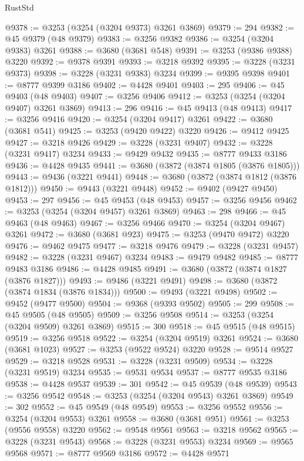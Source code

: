 \begin{lexlean}{RustStd}
\begin{coremodule}
@9378 := @3253 (@3254 (@3204 @9373) @3261 @3869)
@9379 := 294
@9382 := @45 @9379 (@48 @9379)
@9383 := @3256 @9382
@9386 := @3254 (@3204 @9383) @3261
@9388 := @3680 (@3681 @548)
@9391 := @3253 (@9386 @9388) @3220
@9392 := @9378 @9391
@9393 := @3218 @9392
@9395 := @3228 (@3231 @9373)
@9398 := @3228 (@3231 @9383) @3234
@9399 := @9395 @9398
@9401 := @8777 @9399 @3186
@9402 := @4428 @9401
@9403 := 295
@9406 := @45 @9403 (@48 @9403)
@9407 := @3256 @9406
@9412 := @3253 (@3254 (@3204 @9407) @3261 @3869)
@9413 := 296
@9416 := @45 @9413 (@48 @9413)
@9417 := @3256 @9416
@9420 := @3254 (@3204 @9417) @3261
@9422 := @3680 (@3681 @541)
@9425 := @3253 (@9420 @9422) @3220
@9426 := @9412 @9425
@9427 := @3218 @9426
@9429 := @3228 (@3231 @9407)
@9432 := @3228 (@3231 @9417) @3234
@9433 := @9429 @9432
@9435 := @8777 @9433 @3186
@9436 := @4428 @9435
@9441 := @3680 (@3872 (@3874 @1805 (@3876 @1805)))
@9443 := @9436 (@3221 @9441)
@9448 := @3680 (@3872 (@3874 @1812 (@3876 @1812)))
@9450 := @9443 (@3221 @9448)
@9452 := @9402 (@9427 @9450)
@9453 := 297
@9456 := @45 @9453 (@48 @9453)
@9457 := @3256 @9456
@9462 := @3253 (@3254 (@3204 @9457) @3261 @3869)
@9463 := 298
@9466 := @45 @9463 (@48 @9463)
@9467 := @3256 @9466
@9470 := @3254 (@3204 @9467) @3261
@9472 := @3680 (@3681 @923)
@9475 := @3253 (@9470 @9472) @3220
@9476 := @9462 @9475
@9477 := @3218 @9476
@9479 := @3228 (@3231 @9457)
@9482 := @3228 (@3231 @9467) @3234
@9483 := @9479 @9482
@9485 := @8777 @9483 @3186
@9486 := @4428 @9485
@9491 := @3680 (@3872 (@3874 @1827 (@3876 @1827)))
@9493 := @9486 (@3221 @9491)
@9498 := @3680 (@3872 (@3874 @1834 (@3876 @1834)))
@9500 := @9493 (@3221 @9498)
@9502 := @9452 (@9477 @9500)
@9504 := @9368 (@9393 @9502)
@9505 := 299
@9508 := @45 @9505 (@48 @9505)
@9509 := @3256 @9508
@9514 := @3253 (@3254 (@3204 @9509) @3261 @3869)
@9515 := 300
@9518 := @45 @9515 (@48 @9515)
@9519 := @3256 @9518
@9522 := @3254 (@3204 @9519) @3261
@9524 := @3680 (@3681 @1023)
@9527 := @3253 (@9522 @9524) @3220
@9528 := @9514 @9527
@9529 := @3218 @9528
@9531 := @3228 (@3231 @9509)
@9534 := @3228 (@3231 @9519) @3234
@9535 := @9531 @9534
@9537 := @8777 @9535 @3186
@9538 := @4428 @9537
@9539 := 301
@9542 := @45 @9539 (@48 @9539)
@9543 := @3256 @9542
@9548 := @3253 (@3254 (@3204 @9543) @3261 @3869)
@9549 := 302
@9552 := @45 @9549 (@48 @9549)
@9553 := @3256 @9552
@9556 := @3254 (@3204 @9553) @3261
@9558 := @3680 (@3681 @951)
@9561 := @3253 (@9556 @9558) @3220
@9562 := @9548 @9561
@9563 := @3218 @9562
@9565 := @3228 (@3231 @9543)
@9568 := @3228 (@3231 @9553) @3234
@9569 := @9565 @9568
@9571 := @8777 @9569 @3186
@9572 := @4428 @9571

\end{coremodule}
\end{lexlean}
